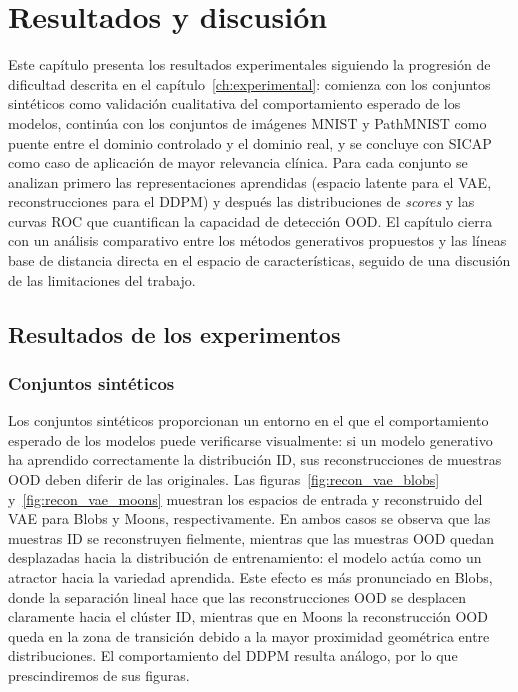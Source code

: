 
\newcommand{\bestsicacivae}{mlp_vae_sicap_c1_s42_lr0.0001}
\newcommand{\bestsicaciddpm}{mlp_ddpm_sicap_c1_s42_lr0.0001_t10}
\newcommand{\bestsicacxiivae}{mlp_vae_sicap_c12_s42_lr0.0005}
\newcommand{\bestsicacxiiddpm}{mlp_ddpm_sicap_c12_s42_lr0.001_t10}

\chapter{Resultados y discusión}
\label{ch:resultados}

Este capítulo presenta los resultados experimentales siguiendo la progresión de
dificultad descrita en el capítulo~\ref{ch:experimental}: comienza con los conjuntos
sintéticos como validación cualitativa del comportamiento esperado de los modelos,
continúa con los conjuntos de imágenes MNIST y PathMNIST como puente entre el dominio
controlado y el dominio real, y se concluye con SICAP como caso de aplicación de mayor
relevancia clínica. Para cada conjunto se analizan primero las representaciones
aprendidas (espacio latente para el VAE, reconstrucciones para el DDPM) y después las
distribuciones de \textit{scores} y las curvas ROC que cuantifican la capacidad de
detección OOD. El capítulo cierra con un análisis comparativo entre los métodos
generativos propuestos y las líneas base de distancia directa en el espacio de
características, seguido de una discusión de las limitaciones del trabajo.

\section{Resultados de los experimentos}
\label{sec:res-experimentos}

\subsection{Conjuntos sintéticos}
\label{subsec:res-sinteticos}

Los conjuntos sintéticos proporcionan un entorno en el que el comportamiento
esperado de los modelos puede verificarse visualmente: si un modelo generativo ha
aprendido correctamente la distribución ID, sus reconstrucciones de muestras OOD
deben diferir de las originales. Las
figuras~\ref{fig:recon_vae_blobs} y~\ref{fig:recon_vae_moons} muestran los espacios
de entrada y reconstruido del VAE para Blobs y Moons, respectivamente. En ambos casos
se observa que las muestras ID se reconstruyen fielmente, mientras que las muestras
OOD quedan desplazadas hacia la distribución de entrenamiento: el modelo actúa como
un atractor hacia la variedad aprendida. Este efecto es más pronunciado en Blobs,
donde la separación lineal hace que las reconstrucciones OOD se desplacen claramente
hacia el clúster ID, mientras que en Moons la reconstrucción OOD queda en la zona de
transición debido a la mayor proximidad geométrica entre distribuciones. El comportamiento del DDPM resulta análogo, por lo que prescindiremos de sus figuras.

